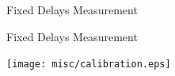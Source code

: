 \documentclass[compress,red]{beamer}
\begin{document}
\logo{}
\begin{frame}{Fixed Delays Measurement}


\end{frame}
\begin{frame}{Fixed Delays Measurement}

  \begin{center}
  \texttt{[image: misc/calibration.eps]}
  \end{center}

\end{frame}
% 
% 
% 
\end{document}
